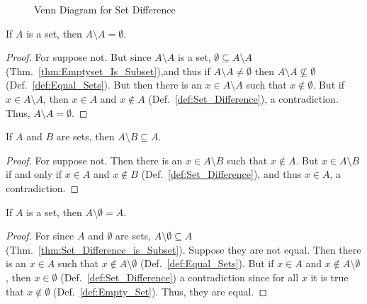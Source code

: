         \begin{figure}[H]
            \centering
            \captionsetup{type=figure}
            
            \caption{Venn Diagram for Set Difference}
            \label{fig:Set_Diff_Venn_Diagram}
        \end{figure} 
        \begin{theorem}
            \label{thm:Set_Difference_of_Set_with_Self}%
            If $A$ is a set, then $A\setminus{A}=\emptyset$.
        \end{theorem}
        \begin{proof}
            For suppose not. But since $A\setminus{A}$ is a set,
            $\emptyset\subseteq{A}\setminus{A}
            $(Thm.~\ref{thm:Emptyset_Is_Subset}),and thus if
            $A\setminus{A}\ne\emptyset$ then $A\setminus{A}\nsubseteq\emptyset$
            (Def.~\ref{def:Equal_Sets}). But then there is an
            $x\in{A}\setminus{A}$ such that $x\notin\emptyset$. But if
            $x\in{A}\setminus{A}$, then $x\in{A}$ and $x\notin{A}$
            (Def.~\ref{def:Set_Difference}), a contradiction. Thus,
            $A\setminus{A}=\emptyset$.
        \end{proof}
        \begin{theorem}
            \label{thm:Set_Difference_is_Subset}%
            If $A$ and $B$ are sets, then $A\setminus{B}\subseteq{A}$.
        \end{theorem}
        \begin{proof}
            For suppose not. Then there is an $x\in{A}\setminus{B}$ such that
            $x\notin{A}$. But $x\in{A}\setminus{B}$ if and only if $x\in{A}$ and
            $x\notin{B}$ (Def.~\ref{def:Set_Difference}), and thus $x\in{A}$, a
            contradiction.
        \end{proof}
        \begin{theorem}
            \label{thm:Set_Difference_of_Set_and_Empty}%
            If $A$ is a set, then $A\setminus\emptyset=A$.
        \end{theorem}
        \begin{proof}
            For since $A$ and $\emptyset$ are sets,
            $A\setminus\emptyset\subseteq{A}$
            (Thm.~\ref{thm:Set_Difference_is_Subset}). Suppose they are not
            equal. Then there is an $x\in{A}$ such that
            $x\notin{A}\setminus\emptyset$ (Def.~\ref{def:Equal_Sets}). But if
            $x\in{A}$ and $x\notin{A}\setminus\emptyset$, then $x\in\emptyset$
            (Def.~\ref{def:Set_Difference}) a contradiction since for all $x$ it
            is true that $x\notin\emptyset$ (Def.~\ref{def:Empty_Set}). Thus,
            they are equal.
        \end{proof}
